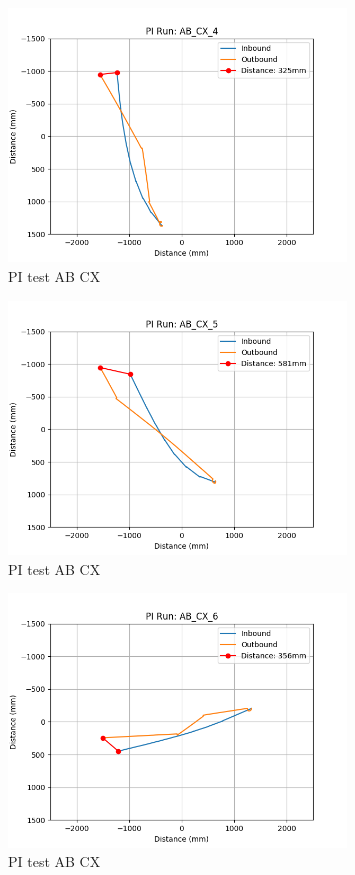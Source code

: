 \documentclass[a4paper,11pt,twoside,openright]{article}
\begin{document}
\begin{figure}[h!]
  \centering
  \includegraphics[width=0.8\textwidth]{AB_CX_4}
  \caption{\label{fig:abcx4}PI test AB\textunderscore
    CX}
\end{figure}

\begin{figure}[h!]
  \centering
  \includegraphics[width=0.8\textwidth]{AB_CX_5}
  \caption{\label{fig:abcx5} PI test AB\textunderscore
    CX}
\end{figure}

\begin{figure}[h!]
  \centering
  \includegraphics[width=0.8\textwidth]{AB_CX_6}
  \caption{\label{fig:abcx6} PI test AB\textunderscore
    CX}
\end{figure}
\end{document}
